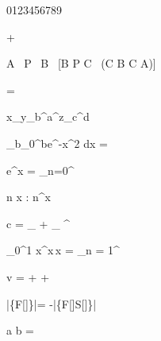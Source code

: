 0123456789

 + 

\forall A \, \exists P \, \forall B \, [B \in P \Leftrightarrow \forall C \, (C \in B \Rightarrow C \in A)]

\sigma = 

x_{y_b^a}^{z_c^d}

\lim_{b\to\infty}\int_0^{b}e^{-x^2} dx = 

e^x = \sum_{n=0}^\infty {}

\forall n \in {} \exists \; x \; \in {} \; : \; n^x \not\in {}

c = \overbrace
{
    _
    +
    _
}^

\int_0^1 x^x\,x = \sum_{n = 1}^

\mathrm{\nabla} \cdot \vec v =
 +
 +

\left\langle\psi\left|\left\{\frac{\delta}{\delta\phi}F[\phi]\right\}\right|\psi\right\rangle = -\left\langle\psi\left|\left\{F[\phi]\frac{\delta}{\delta\phi}S[\phi]\right\}\right|\psi\right\rangle

  

a \not{=} b \quad {}= \quad {}
